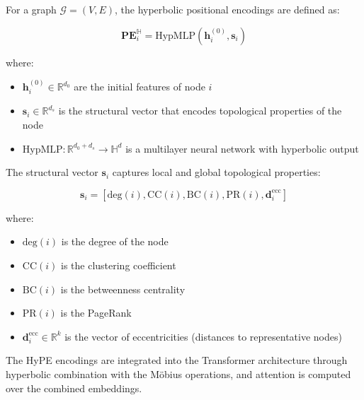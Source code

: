 \begin{definition}\label{def:hype_encoding}
For a graph $\mathcal{G} = (V, E)$, the hyperbolic positional encodings are defined as:

\begin{equation}
    \mathbf{PE}_i^{\mathbb{H}} = \text{HypMLP}(\mathbf{h}_i^{(0)}, \mathbf{s}_i)
    \label{eq:hyperbolic_positional_encoding}
\end{equation}

where:
\begin{itemize}
    \item $\mathbf{h}_i^{(0)} \in \mathbb{R}^{d_0}$ are the initial features of node $i$
    \item $\mathbf{s}_i \in \mathbb{R}^{d_s}$ is the structural vector that encodes topological properties of the node
    \item $\text{HypMLP}: \mathbb{R}^{d_0 + d_s} \to \mathbb{H}^d$ is a multilayer neural network with hyperbolic output
\end{itemize}
\end{definition}

\begin{definition}\label{def:structural_vector}
The structural vector $\mathbf{s}_i$ captures local and global topological properties:

\begin{equation}
\mathbf{s}_i = [\text{deg}(i), \text{CC}(i), \text{BC}(i), \text{PR}(i), \mathbf{d}_i^{\text{ecc}}]
\end{equation}

where:
\begin{itemize}
    \item $\text{deg}(i)$ is the degree of the node
    \item $\text{CC}(i)$ is the clustering coefficient
    \item $\text{BC}(i)$ is the betweenness centrality
    \item $\text{PR}(i)$ is the PageRank
    \item $\mathbf{d}_i^{\text{ecc}} \in \mathbb{R}^k$ is the vector of eccentricities (distances to representative nodes)
\end{itemize}
\end{definition}

The HyPE encodings are integrated into the \gls{Transformer} architecture through hyperbolic combination with the Möbius operations, and attention is computed over the combined embeddings.

